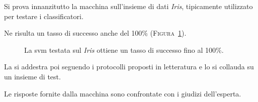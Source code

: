 Si prova innanzitutto la macchina sull'insieme di dati \emph{Iris},
tipicamente utilizzato per testare i classificatori.

Ne risulta un tasso di successo anche del 100\% (\textsc{Figura~\ref{fig:iris100}}).

\begin{figure}
  \centering
  \caption{La \ac{svm} testata sul \textit{Iris} ottiene un tasso di successo fino al 100\%.}
  \label{fig:iris100}
\end{figure}

La si addestra poi seguendo i protocolli proposti in letteratura
e lo si collauda su un insieme di test.

Le risposte fornite dalla macchina sono confrontate con i giudizi dell'esperta.